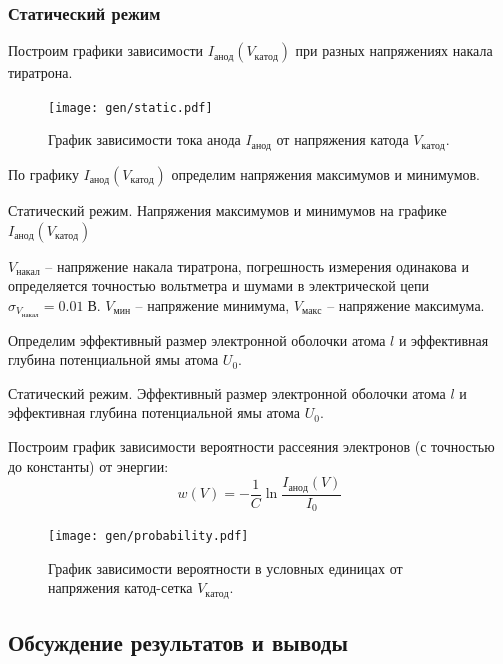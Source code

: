 \documentclass[10pt,a4paper]{article}
\newcommand{\V}{\; В}
\begin{document}
	\subsubsection*{Статический режим}

	Построим графики зависимости $I_{анод}(V_{катод})$ при разных напряжениях накала тиратрона.

	\begin{figure}[H]
		\centering
		\texttt{[image: gen/static.pdf]}
		\caption{График зависимости тока анода $I_{анод}$ от напряжения катода $V_{катод}$.}
	\end{figure}
	
	По графику $I_{анод}(V_{катод})$ определим напряжения максимумов и минимумов.
	
	\begin{table}[H]
		\caption{Статический режим. Напряжения максимумов и минимумов на графике $I_{анод}(V_{катод})$}
		\label{table:st}
		\begin{center}
			
		\end{center}
		\caption*{$V_{накал}$ -- напряжение накала тиратрона, погрешность измерения одинакова и определяется точностью вольтметра и шумами в электрической цепи $\sigma_{V_{накал}} = 0.01 \V$. $V_{мин}$ -- напряжение минимума, $V_{макс}$ -- напряжение максимума.}
	\end{table}

	Определим эффективный размер электронной оболочки атома $l$ и эффективная глубина потенциальной ямы атома $U_0$.
	
	\begin{table}[H]
		\caption{Статический режим. Эффективный размер электронной оболочки атома $l$ и эффективная глубина потенциальной ямы атома $U_0$.}
		\label{table:atom-st}
		\begin{center}
			
		\end{center}
	\end{table}

	Построим график зависимости вероятности рассеяния электронов (с точностью до константы) от энергии:
	$$
	w(V) = -\frac{1}{C} \ln{\frac{I_{анод}(V)}{I_0}}
	$$
	\begin{figure}[H]
		\centering
		\texttt{[image: gen/probability.pdf]}
		\caption{График зависимости вероятности в условных единицах от напряжения катод-сетка $V_{катод}$.}
	\end{figure}

	\subsection*{Обсуждение результатов и выводы}
	
\end{document}
